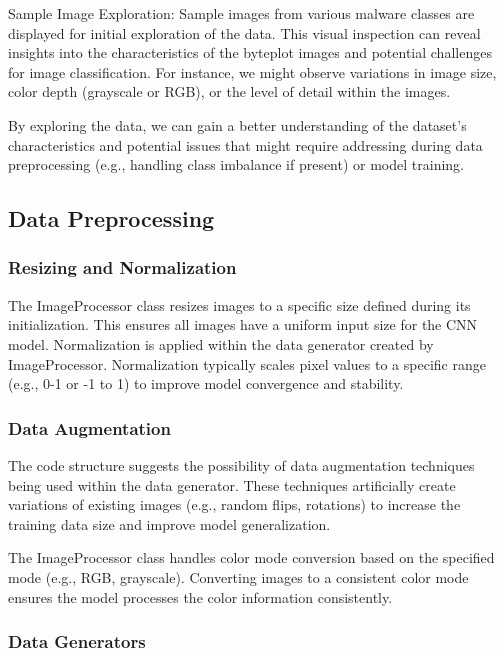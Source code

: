 \documentclass[conference]{IEEEtran}
\begin{document}
        Sample Image Exploration: Sample images from various malware classes are displayed for initial exploration of the data. This visual inspection can reveal insights into the characteristics of the byteplot images and potential challenges for image classification. For instance, we might observe variations in image size, color depth (grayscale or RGB), or the level of detail within the images.

By exploring the data, we can gain a better understanding of the dataset's characteristics and potential issues that might require addressing during data preprocessing (e.g., handling class imbalance if present) or model training.


\subsection{Data Preprocessing}

\subsubsection{Resizing and Normalization}

    The ImageProcessor class resizes images to a specific size defined during its initialization. This ensures all images have a uniform input size for the CNN model.
    Normalization is applied within the data generator created by ImageProcessor. Normalization typically scales pixel values to a specific range (e.g., 0-1 or -1 to 1) to improve model convergence and stability.

\subsubsection{Data Augmentation}

    The code structure suggests the possibility of data augmentation techniques being used within the data generator. These techniques artificially create variations of existing images (e.g., random flips, rotations) to increase the training data size and improve model generalization.

    The ImageProcessor class handles color mode conversion based on the specified mode (e.g., RGB, grayscale). Converting images to a consistent color mode ensures the model processes the color information consistently.

\subsubsection{Data Generators}
\end{document}

